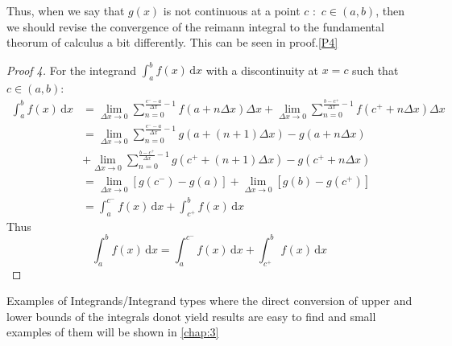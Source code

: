Thus, when we say that $g(x)$ is not continuous at a point $c\,\,: \,\, c\in(a,b)$, then we should revise the convergence of the reimann integral to the fundamental theorum of calculus a bit differently. This can be seen in proof.\ref{P4}
\begin{proof}[Proof 4] \label{P4}
	For the integrand $\int_{a}^{b}f(x)\,\mathrm{d}x$ with a discontinuity at $x=c$ such that $c \in (a,b)$:
	\begin{align*}
		\int_{a}^{b}f(x)\,\mathrm{d}x &= \lim_{\Delta x \to 0} \sum_{n=0}^{\frac{c^- - a}{\Delta x}-1}f(a + n\Delta x)\Delta x + \lim_{\Delta x \to 0}\sum_{n=0}^{\frac{b-c^+}{\Delta x}-1}f(c^+ + n\Delta x)\Delta x \\
		&= \lim_{\Delta x \to 0}\sum_{n=0}^{\frac{c^- - a}{\Delta x}-1}g(a + (n+1)\Delta x) - g(a + n \Delta x)\\
		& + \lim_{\Delta x \to 0}\sum_{n=0}^{\frac{b-c^+}{\Delta x}-1}g(c^+ + (n+1)\Delta x) - g(c^+ + n\Delta x) \\
		&= \lim_{\Delta x \to 0}[g(c^-) - g(a)] + \lim_{\Delta x \to 0}[g(b) - g(c^+)] \\
		& = \int_{a}^{c^-}f(x)\,\mathrm{d}x + \int_{c^+}^{b}f(x)\,\mathrm{d}x &&
	\end{align*}
	Thus 
	$$\int_{a}^{b}f(x)\,\mathrm{d}x = \int_{a}^{c^-}f(x)\,\mathrm{d}x + \int_{c^+}^{b}f(x)\,\mathrm{d}x$$
\end{proof}

Examples of Integrands/Integrand types where the direct conversion of upper and lower bounds of the integrals donot yield results are easy to find and small examples of them will be shown in \autoref{chap:3}